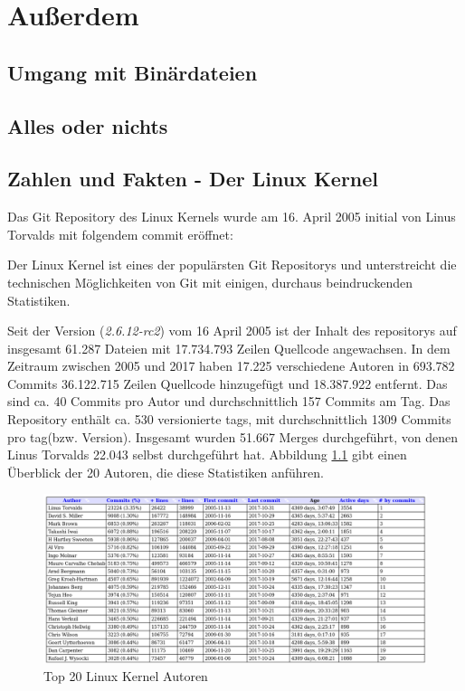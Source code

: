 \chapter{Außerdem}\label{cha:lookout}
\section{Umgang mit Binärdateien}
\section{Alles oder nichts}
\section{Zahlen und Fakten - Der Linux Kernel}\label{sec:kernel}
Das Git Repository des Linux Kernels wurde am 16. April 2005 initial von Linus
Torvalds mit folgendem \gls{commit}\cite{link:linuxgit} eröffnet:



Der Linux Kernel ist eines der populärsten Git Repositorys und unterstreicht
die technischen Möglichkeiten von Git mit einigen, durchaus beindruckenden
Statistiken.

Seit der Version (\textit{2.6.12-rc2}) vom 16 April 2005 ist der Inhalt des
\glspl{repository} auf insgesamt 61.287 Dateien mit 17.734.793 Zeilen Quellcode
angewachsen. In dem Zeitraum zwischen 2005 und 2017 haben 17.225 verschiedene
Autoren in 693.782 Commits 36.122.715 Zeilen Quellcode hinzugefügt und
18.387.922 entfernt. Das sind ca. 40 Commits pro Autor und durchschnittlich
157 Commits am Tag. Das Repository enthält ca. 530 versionierte \glspl{tag},
mit durchschnittlich 1309 Commits pro \gls{tag}(bzw. Version). Insgesamt wurden
51.667 Merges durchgeführt, von denen Linus Torvalds 22.043 selbst durchgeführt
hat. Abbildung \ref{top20} gibt einen Überblick der 20 Autoren, die diese
Statistiken anführen.

\begin{figure}
	\centering
  \includegraphics[scale=0.40]{images/top_20_of_linux_authors.png}
	\caption{Top 20 Linux Kernel Autoren}
	\label{top20}
\end{figure}

